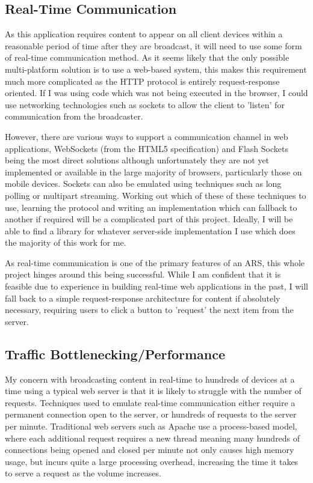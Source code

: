 \documentclass[a4papert,11pt,notitlepage]{ltxdoc}
\begin{document}
\subsection{Real-Time Communication}
As this application requires content to appear on all client devices within a reasonable period of time after they are broadcast, it will need to use some form of real-time communication method. As it seems likely that the only possible multi-platform solution is to use a web-based system, this makes this requirement much more complicated as the HTTP protocol is entirely request-response oriented. If I was using code which was not being executed in the browser, I could use networking technologies such as sockets to allow the client to 'listen' for communication from the broadcaster.

However, there are various ways to support a  communication channel in web applications, WebSockets (from the HTML5 specification) and Flash Sockets being the most direct solutions although unfortunately they are not yet implemented or available in the large majority of browsers, particularly those on mobile devices. Sockets can also be emulated using techniques such as long polling or multipart streaming. Working out which of these of these techniques to use, learning the protocol and writing an implementation which can fallback to another if required will be a complicated part of this project. Ideally, I will be able to find a library for whatever server-side implementation I use which does the majority of this work for me.

As real-time communication is one of the primary features of an ARS, this whole project hinges around this being successful. While I am confident that it is feasible due to experience in building real-time web applications in the past, I will fall back to a simple request-response architecture for content if absolutely necessary, requiring users to click a button to 'request' the next item from the server.

\subsection{Traffic Bottlenecking/Performance}
\label{sec:performance}
My concern with broadcasting content in real-time to hundreds of devices at a time using a typical web server is that it is likely to struggle with the number of requests. Techniques used to emulate real-time communication either require a permanent connection open to the server, or hundreds of requests to the server per minute. Traditional web servers such as Apache use a process-based model, where each additional request requires a new thread meaning many hundreds of connections being opened and closed per minute not only causes high memory usage, but incurs quite a large processing overhead, increasing the time it takes to serve a request as the volume increases.
\end{document}
